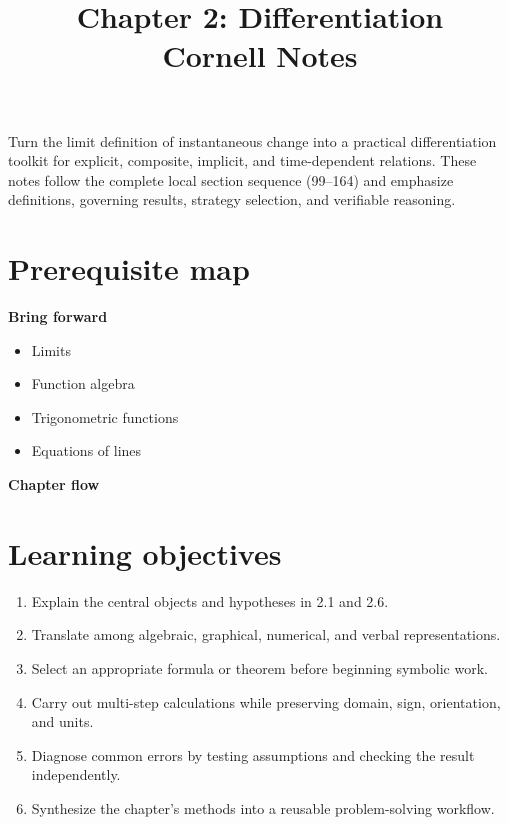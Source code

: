 \documentclass[11pt]{article}
\title{Chapter 2: Differentiation\\[2mm]\large Cornell Notes}
\author{}
\date{}
\begin{document}
\maketitle
\thispagestyle{fancy}
\begin{orientationbox}
Turn the limit definition of instantaneous change into a practical differentiation toolkit for explicit, composite, implicit, and time-dependent relations. These notes follow the complete local section sequence (99--164) and emphasize definitions, governing results, strategy selection, and verifiable reasoning.
\end{orientationbox}

\section{Prerequisite map}
\begin{minipage}[t]{0.42\textwidth}
\textbf{Bring forward}
\begin{itemize}
\item Limits
\item Function algebra
\item Trigonometric functions
\item Equations of lines
\end{itemize}
\end{minipage}\hfill
\begin{minipage}[t]{0.54\textwidth}
\textbf{Chapter flow}
\begin{center}
\end{center}
\end{minipage}

\section{Learning objectives}
\begin{enumerate}
\item Explain the central objects and hypotheses in 2.1 and 2.6.
\item Translate among algebraic, graphical, numerical, and verbal representations.
\item Select an appropriate formula or theorem before beginning symbolic work.
\item Carry out multi-step calculations while preserving domain, sign, orientation, and units.
\item Diagnose common errors by testing assumptions and checking the result independently.
\item Synthesize the chapter's methods into a reusable problem-solving workflow.
\end{enumerate}
\end{document}
